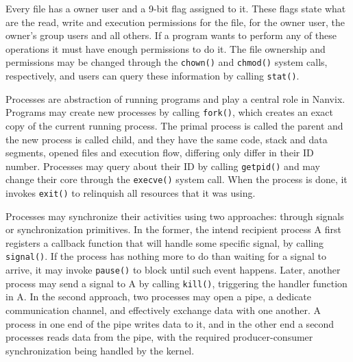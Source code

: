\documentclass[10pt,a4paper]{article}
\begin{document}
Every file has a owner user and a 9-bit flag assigned to it. These flags state what are the read, write and execution permissions for the file, for the owner user, the owner's group users and all others. If a program wants to perform any of these operations it must have enough permissions to do it. The file ownership and permissions may be changed through the \texttt{chown()} and \texttt{chmod()} system calls, respectively, and users can query these information by calling \texttt{stat()}.

Processes are abstraction of running programs and play a central role in Nanvix. Programs may create new processes by calling \texttt{fork()}, which creates an exact copy of the current running process. The primal process is called the parent and the new process is called child, and they have the same code, stack and data segments, opened files and execution flow, differing only differ in their ID number. Processes may query about their ID by calling \texttt{getpid()} and may change their core through the \texttt{execve()} system call. When the process is done, it invokes \texttt{exit()} to relinquish all resources that it was using.

Processes may synchronize their activities using two approaches: through signals or synchronization primitives. In the former, the intend recipient process A first registers a callback function that will handle some specific signal, by calling \texttt{signal()}. If the process has nothing more to do than waiting for a signal to arrive, it may invoke \texttt{pause()} to block until such event happens. Later, another process may send a signal to A by calling \texttt{kill()}, triggering the handler function in A. In the second approach, two processes may open a pipe, a dedicate communication channel, and effectively exchange data with one another. A process in one end of the pipe writes data to it, and in the other end a second processes reads data from the pipe, with the required producer-consumer synchronization being handled by the kernel.
\end{document}
